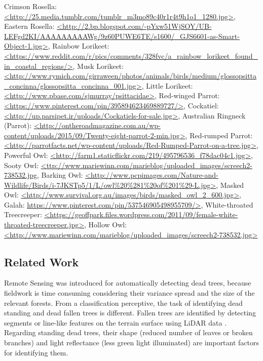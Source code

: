 \documentclass{subfiles}
\begin{document}
{{		Crimson Rosella: \url{<http://25.media.tumblr.com/tumblr_m3mo89c40r1r4t9h1o1_1280.jpg>},
		Eastern Rosella: \url{<http://2.bp.blogspot.com/-pYxw51WjSOY/UB-LEFgd2KI/AAAAAAAAAWg/9z60PUWE6TE/s1600/_GJS6601-as-Smart-Object-1.jpg>},
		Rainbow Lorikeet: \url{<https://www.reddit.com/r/pics/comments/328fvc/a_rainbow_lorikeet_found_in_coastal_regions/>},     	Musk Lorikeet: \url{<http://www.rymich.com/girraween/photos/animals/birds/medium/glossopsitta_concinna/glossopsitta_concinna_001.jpg>},     	Little Lorikeet: \url{<http://www.pbase.com/sjmurray/psittacidae>},     	Red-winged Parrot: \url{<https://www.pinterest.com/pin/395894623469889727/>}, Cockatiel: \url{<http://up.parsipet.ir/uploads/Cockatiels-for-sale.jpg>},     	Australian Ringneck (Parrot): \url{<http://ontheroadmagazine.com.au/wp-content/uploads/2015/09/Twenty-eight-parrot-2-min.jpg>},     	Red-rumped Parrot: \url{<http://parrotfacts.net/wp-content/uploads/Red-Rumped-Parrot-on-a-tree.jpg>},     	Powerful Owl: \url{<http://farm1.staticflickr.com/219/495796536_f78dac04c1.jpg>},     	Sooty Owl: \url{<ttp://www.mariewinn.com/marieblog/uploaded_images/screech2-738532.jpg},     	Barking Owl: \url{<http://www.pcpimages.com/Nature-and-Wildlife/Birds/i-7JKSTp5/1/L/owl\%20\%281\%20of\%201\%29-L.jpg>},     	Masked Owl: \url{<http://www.survival.org.au/images/birds/masked_owl_2_600.jpg>},  	Galah: \url{https://www.pinterest.com/pin/537546905498955709/>},   	White-throated Treecreeper: \url{<https://geoffpark.files.wordpress.com/2011/09/female-white-throated-treecreeper.jpg>}, Hollow Owl: \url{<http://www.mariewinn.com/marieblog/uploaded_images/screech2-738532.jpg>} }
}





\subsection{Related Work}

\par Remote Sensing was introduced for automatically detecting dead trees, because fieldwork is time consuming considering their variance spread and the size of the relevant forests. From a classification perceptive, the task of identifying dead standing and dead fallen trees is different. Fallen trees are identified by detecting segments or line-like features on the terrain surface using LiDAR data \cite{Polewski2015} \cite{Mucke2013}. Regarding standing dead trees, their shape (reduced number of leaves or broken branches) \cite{Yao2012} and light reflectance (less green light illuminated) \cite{Pasher2009} are important factors for identifying them.
\end{document}
